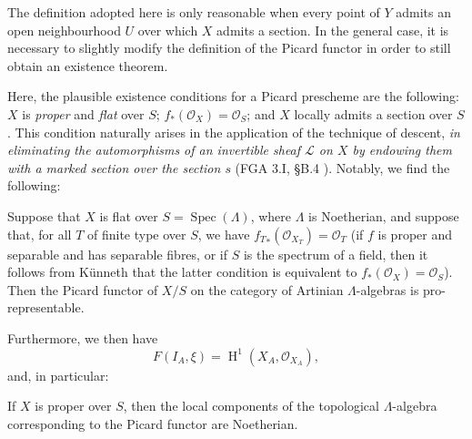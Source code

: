 \begin{remark}\label{fga3.ii-c.3-remark}
    The definition adopted here is only reasonable when every point of $Y$ admits an open neighbourhood $U$ over which $X$ admits a section.
    In the general case, it is necessary to slightly modify the definition of the Picard functor in order to still obtain an existence theorem.

    Here, the plausible existence conditions for a Picard prescheme are the following: $X$ is \emph{proper} and \emph{flat} over $S$; $f_*(\mathcal{O}_X)=\mathcal{O}_S$; and $X$ locally admits a section over $S$.
    This condition naturally arises in the application of the technique of descent, \emph{in eliminating the automorphisms of an invertible sheaf $\mathcal{L}$ on $X$ by endowing them with a marked section over the section $s$} (FGA 3.I, §B.4 ).
    Notably, we find the following:
\end{remark}

\begin{proposition}\label{fga3.ii-c.3-proposition-3.1}

    Suppose that $X$ is flat over $S=\operatorname{Spec}(\Lambda)$, where $\Lambda$ is Noetherian, and suppose that, for all $T$ of finite type over $S$, we have ${f_T}_*(\mathcal{O}_{X_T})=\mathcal{O}_T$ (if $f$ is proper and separable and has separable fibres, or if $S$ is the spectrum of a field, then it follows from Künneth that the latter condition is equivalent to $f_*(\mathcal{O}_X)=\mathcal{O}_S$).
    Then the Picard functor of $X/S$ on the category of Artinian $\Lambda$-algebras is pro-representable.

    Furthermore, we then have
    \[
        F(I_A,\xi)
        = \operatorname{H}^1(X_A,\mathcal{O}_{X_A}),
    \]
    and, in particular:
\end{proposition}

\begin{corollary}\label{fga3.ii-c.3-proposition-3.1-corollary}
    If $X$ is proper over $S$, then the local components of the topological $\Lambda$-algebra corresponding to the Picard functor are Noetherian.
\end{corollary}

